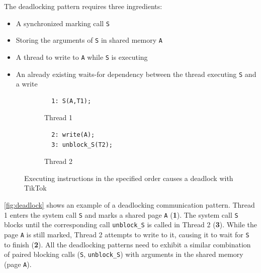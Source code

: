\documentclass[conference]{IEEEtran}
\newcommand{\sysname}{TikTok}
\begin{document}
The deadlocking pattern requires three ingredients:

\begin{itemize}
  \item A synchronized marking call \texttt{S}
  \item Storing the arguments of \texttt{S} in shared memory \texttt{A}
  \item A thread to write to \texttt{A} while \texttt{S} is executing
  \item An already existing waits-for dependency between the thread executing
  \texttt{S} and a write
\end{itemize}

\begin{figure}
  \centering
  \begin{subfigure}[b]{0.45\linewidth}
  \begin{minipage}{\linewidth}
  \begin{lstlisting}
  1: S(A,T1);  
  \end{lstlisting}
  \end{minipage}
  \caption{Thread 1}
  \end{subfigure}
  \hfill
  \begin{subfigure}[b]{0.45\linewidth}
  \begin{minipage}{\linewidth}
  \begin{lstlisting}
  2: write(A);
  3: unblock_S(T2);
  \end{lstlisting}  
  \end{minipage}
  \caption{Thread 2}
  \end{subfigure}
  \caption{Executing instructions in the specified order causes a deadlock with \sysname}
  \label{fig:deadlock}
\end{figure}

\autoref{fig:deadlock} shows an example of a deadlocking communication pattern.
Thread 1 enters the system call \texttt{S} and marks a shared page \texttt{A}
(\textbf{1}). The system call \texttt{S} blocks until the corresponding call
\texttt{unblock\_S} is called in Thread 2 (\textbf{3}). While the page
\texttt{A} is still marked, Thread 2 attempts to write to it, causing it to wait
for \texttt{S} to finish (\textbf{2}). All the deadlocking patterns need to
exhibit a similar combination of paired blocking calls (\texttt{S},
\texttt{unblock\_S}) with arguments in the shared memory (page \texttt{A}).
\end{document}
